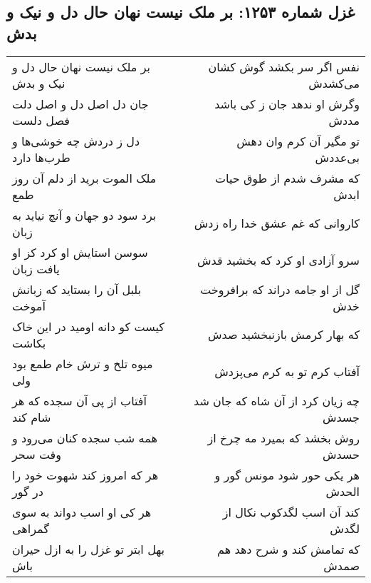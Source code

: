 \begin{center}
\section*{غزل شماره ۱۲۵۳: بر ملک نیست نهان حال دل و نیک و بدش}
\label{sec:1253}
\begin{longtable}{l p{0.5cm} r}
بر ملک نیست نهان حال دل و نیک و بدش
&&
نفس اگر سر بکشد گوش کشان می‌کشدش
\\
جان دل اصل دل و اصل دلت فصل دلست
&&
وگرش او ندهد جان ز کی باشد مددش
\\
دل ز دردش چه خوشی‌ها و طرب‌ها دارد
&&
تو مگیر آن کرم وان دهش بی‌عددش
\\
ملک الموت برید از دلم آن روز طمع
&&
که مشرف شدم از طوق حیات ابدش
\\
برد سود دو جهان و آنچ نیاید به زبان
&&
کاروانی که غم عشق خدا راه زدش
\\
سوسن استایش او کرد کز او یافت زبان
&&
سرو آزادی او کرد که بخشید قدش
\\
بلبل آن را بستاید که زبانش آموخت
&&
گل از او جامه دراند که برافروخت خدش
\\
کیست کو دانه اومید در این خاک بکاشت
&&
که بهار کرمش بازنبخشید صدش
\\
میوه تلخ و ترش خام طمع بود ولی
&&
آفتاب کرم تو به کرم می‌پزدش
\\
آفتاب از پی آن سجده که هر شام کند
&&
چه زیان کرد از آن شاه که جان شد جسدش
\\
همه شب سجده کنان می‌رود و وقت سحر
&&
روش بخشد که بمیرد مه چرخ از حسدش
\\
هر که امروز کند شهوت خود را در گور
&&
هر یکی حور شود مونس گور و الحدش
\\
هر کی او اسب دواند به سوی گمراهی
&&
کند آن اسب لگدکوب نکال از لگدش
\\
بهل ابتر تو غزل را به ازل حیران باش
&&
که تمامش کند و شرح دهد هم صمدش
\\
\end{longtable}
\end{center}
